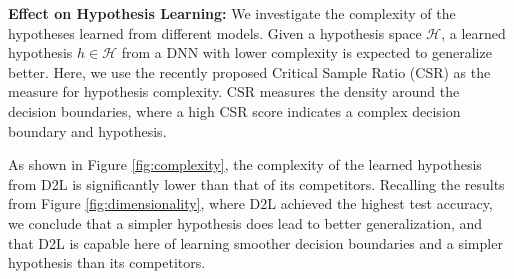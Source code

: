 \documentclass{article}
\begin{document}
\textbf{Effect on Hypothesis Learning:}
\label{sec:complexity}
We investigate the complexity of the hypotheses learned from different models. Given a hypothesis space $\mathcal{H}$, a learned hypothesis $h \in \mathcal{H}$ from a DNN with lower complexity is expected to generalize better. 
Here, we use the recently proposed Critical Sample Ratio (CSR) \cite{arpit2017closer} as the measure for hypothesis complexity. CSR measures the density around the decision boundaries, where a high CSR score indicates a complex decision boundary and hypothesis.

As shown in Figure \ref{fig:complexity}, the complexity of the learned hypothesis from D2L is significantly lower than that of its competitors. Recalling the results from Figure \ref{fig:dimensionality}, where D2L achieved the highest test accuracy, we conclude that a simpler hypothesis does lead to better generalization, and that D2L is capable here of learning smoother decision boundaries and a simpler hypothesis than its competitors.

\end{document}
